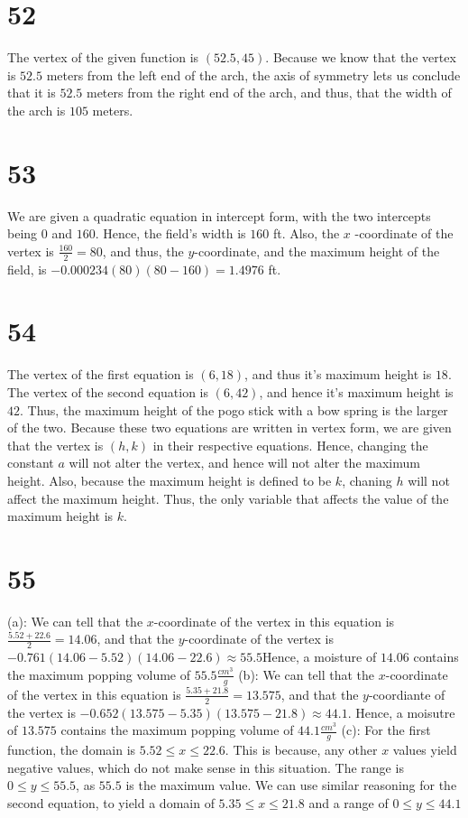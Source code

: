 \documentclass{article}
\theoremstyle{definition}
\begin{document}
\section*{52}
The vertex of the given function is $(52.5,45)$. Because we know that the vertex is $52.5$ meters from the left end of the arch, the axis of symmetry lets 
us conclude that it is $52.5$ meters from the right end of the arch, and thus, that the width of the arch is $105$ meters.

\section*{53}
We are given a quadratic equation in intercept form, with the two intercepts being $0$ and $160$. Hence, the field's width is $160$ ft. Also, the $x$
-coordinate of the vertex is $\frac{160}{2}=80$, and thus, the $y$-coordinate, and the maximum height of the field, is $-0.000234(80)(80-160)=1.4976$ ft.

\section*{54}
The vertex of the first equation is $(6,18)$, and thus it's maximum height is $18$. The vertex of the second equation is $(6,42)$, and hence it's 
maximum height is $42$. Thus, the maximum height of the pogo stick with a bow spring is the larger of the two. Because these two equations are written in 
vertex form, we are given that the vertex is $(h,k)$ in their respective equations. Hence, changing the constant $a$ will not alter the vertex, and hence 
will not alter the maximum height. Also, because the maximum height is defined to be $k$, chaning $h$ will not affect the maximum height. Thus, the only variable 
that affects the value of the maximum height is $k$.

\section*{55}
(a): We can tell that the $x$-coordinate of the vertex in this equation is $\frac{5.52+22.6}{2}=14.06$, and that the $y$-coordinate of the vertex is 
$-0.761(14.06-5.52)(14.06-22.6)\approx 55.5$\newline Hence, a moisture of $14.06$ contains the maximum popping volume of $55.5\frac{cm^3}{g}$\newline
(b): We can tell that the $x$-coordinate of the vertex in this equation is $\frac{5.35+21.8}{2}=13.575$, and that the $y$-coordiante of the vertex is 
$-0.652(13.575-5.35)(13.575-21.8)\approx 44.1$. Hence, a moisutre of $13.575$ contains the maximum popping volume of $44.1\frac{cm^3}{g}$\newline
(c): For the first function, the domain is $5.52\le x\le 22.6$. This is because, any other $x$ values yield negative values, which do not make sense 
in this situation. The range is $0\le y\le 55.5$, as $55.5$ is the maximum value. We can use similar reasoning for the second equation, to yield a 
domain of $5.35\le x\le 21.8$ and a range of $0\le y\le 44.1$
\end{document}
